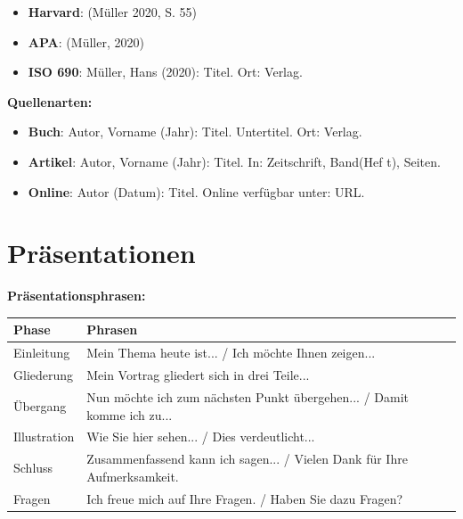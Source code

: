 \begin{itemize}
    \item \textbf{Harvard}: (Müller 2020, S. 55)
    \item \textbf{APA}: (Müller, 2020)
    \item \textbf{ISO 690}: Müller, Hans (2020): Titel. Ort: Verlag.
\end{itemize}

\bigskip
\noindent\textbf{Quellenarten:}

\begin{itemize}
    \item \textbf{Buch}: Autor, Vorname (Jahr): Titel. Untertitel. Ort: Verlag.
    \item \textbf{Artikel}: Autor, Vorname (Jahr): Titel. In: Zeitschrift, Band(Hef t), Seiten.
    \item \textbf{Online}: Autor (Datum): Titel. Online verfügbar unter: URL.
\end{itemize}

\section{Präsentationen}
\label{sec:Praesentationen}

\bigskip
\noindent\textbf{Präsentationsphrasen:}

\begin{center}
\begin{tabular}{|l|p{8cm}|}
\hline
Phase & Phrasen \\ \hline
Einleitung & \begin{minipage}{8cm}Mein Thema heute ist... / Ich möchte Ihnen zeigen...\end{minipage} \\ \hline
Gliederung & \begin{minipage}{8cm}Mein Vortrag gliedert sich in drei Teile...\end{minipage} \\ \hline
Übergang & \begin{minipage}{8cm}Nun möchte ich zum nächsten Punkt übergehen... / Damit komme ich zu...\end{minipage} \\ \hline
Illustration & \begin{minipage}{8cm}Wie Sie hier sehen... / Dies verdeutlicht...\end{minipage} \\ \hline
Schluss & \begin{minipage}{8cm}Zusammenfassend kann ich sagen... / Vielen Dank für Ihre Aufmerksamkeit.\end{minipage} \\ \hline
Fragen & \begin{minipage}{8cm}Ich freue mich auf Ihre Fragen. / Haben Sie dazu Fragen?\end{minipage} \\ \hline
\end{tabular}
\end{center}

\chapterend